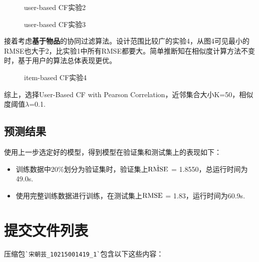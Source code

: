 \documentclass[12pt, a4paper]{ctexart}
\begin{document}
\begin{figure}[htbp]
    \centering
    \caption{user-based CF实验2}
    \label{fig.2}
\end{figure}

\begin{figure}[htbp]
    \centering
    \caption{user-based CF实验3}
    \label{fig.3}
\end{figure}

接着考虑\textbf{基于物品}的协同过滤算法。设计范围比较广的实验4，从图4可见最小的RMSE也大于2，比实验1中所有RMSE都要大。简单推断知在相似度计算方法不变时，基于用户的算法总体表现更优。

\begin{figure}[htbp]
    \centering
    \caption{item-based CF实验4}
    \label{fig.4}
\end{figure}

综上，选择User-Based CF with Pearson Correlation，近邻集合大小K=50，相似度阈值$\lambda$=0.1.

\subsection{预测结果}

使用上一步选定好的模型，得到模型在验证集和测试集上的表现如下：
\begin{itemize}
    \item 训练数据中20\%划分为验证集时，验证集上$\hat{\rm{RMSE}}$ = 1.8550，总运行时间为49.0s.
    \item 使用完整训练数据进行训练，在测试集上$\rm{RMSE}$ = 1.83，运行时间为60.9s.
\end{itemize}

\section{提交文件列表}

压缩包\verb|`宋朝芸_10215001419_1`|包含以下这些内容：
\end{document}
